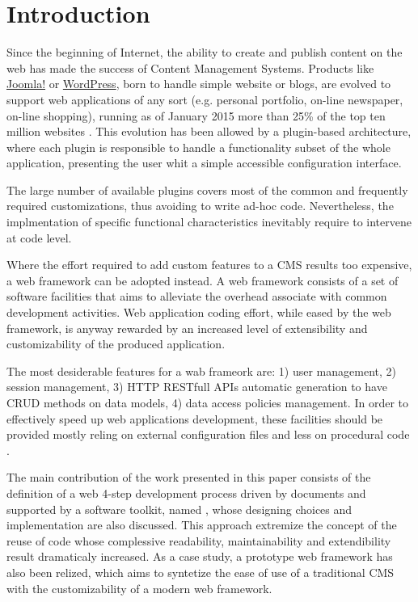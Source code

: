 \section{Introduction}\label{sec:introduction}

Since the beginning of Internet, the ability to create and publish content on the web has made the success of Content Management Systems. Products like \href{http://www.joomla.org/}{Joomla!} or \href{https://wordpress.org/}{WordPress}, born to handle simple website or blogs, are evolved to support web applications of any sort (e.g.  personal portfolio, on-line newspaper, on-line shopping), running as of January 2015 more than 25\% of the top ten million websites \cite{usage-cms}. This evolution has been allowed by a plugin-based architecture, where each plugin is responsible to handle a functionality subset of the whole application, presenting the user whit a simple accessible configuration interface.

The large number of available plugins covers most of the common and frequently required customizations, thus avoiding to write ad-hoc code. Nevertheless, the implmentation of specific functional characteristics inevitably require to intervene at code level.

Where the effort required to add custom features to a CMS results too expensive, a web framework can be adopted instead. A web framework consists of a set of software facilities that aims to alleviate the overhead associate with common development activities. Web application coding effort, while eased by the web framework, is anyway rewarded by an increased level of extensibility and customizability of the produced application.

The most desiderable features for a wab frameork are: 1) user management, 2) session management, 3) HTTP RESTfull APIs automatic generation to have CRUD methods on data models, 4) data access policies management. In order to effectively speed up web applications development, these facilities should be provided mostly reling on external configuration files and less on procedural code \cite{6859693}.

The main contribution of the work presented in this paper consists of the definition of a web 4-step development process driven by documents and supported by a software toolkit, named , whose designing choices and implementation are also discussed. This approach extremize the concept of the reuse of code whose complessive readability, maintainability and extendibility result dramaticaly increased. As a case study, a prototype web framework has also been relized, which aims to syntetize the ease of use of a traditional CMS with the customizability of a modern web framework.

